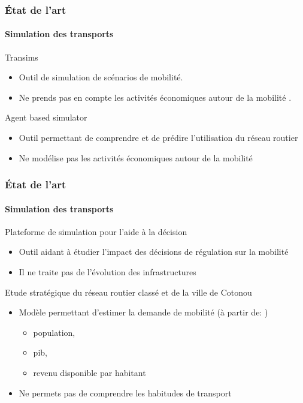 \begin{frame}
    \frametitle{État de l'art}
    \framesubtitle{Simulation des transports}
    \begin{block}{Transims~\parencite{smith1995transims} }
        \begin{itemize}
            \item {} Outil de simulation de scénarios de mobilité.
            \item {} Ne prends pas en compte les activités économiques autour de la mobilité .
        \end{itemize}
    \end{block}
    \begin{block}{Agent based simulator~\parencite{zargayouna2013agent}}
        \begin{itemize}
            \item {} Outil permettant de comprendre et de prédire l'utilisation du réseau routier
            \item {} Ne modélise pas les activités économiques autour de la mobilité
        \end{itemize}
    \end{block}
\end{frame}

\begin{frame}
    \frametitle{État de l'art}
    \framesubtitle{Simulation des transports}
    \begin{block}{Plateforme de simulation pour l'aide à la décision~\parencite{nguyen2015plate}}
        \begin{itemize}
            \item {} Outil aidant à étudier l'impact des décisions de régulation sur la mobilité
            \item {} Il ne traite pas de l'évolution des infrastructures
        \end{itemize}
    \end{block}
    \begin{block}{Etude stratégique du réseau routier classé et de la ville de Cotonou~\parencite{louisberger2017etudes}}
        \begin{itemize}
            \item {} Modèle permettant d'estimer la demande de mobilité (à partir de: )
            \begin{itemize}
                \item population,
                \item pib,
                \item revenu disponible par habitant
            \end{itemize}
            \item {} Ne permets pas de comprendre les habitudes de transport
        \end{itemize}
    \end{block}
\end{frame}

